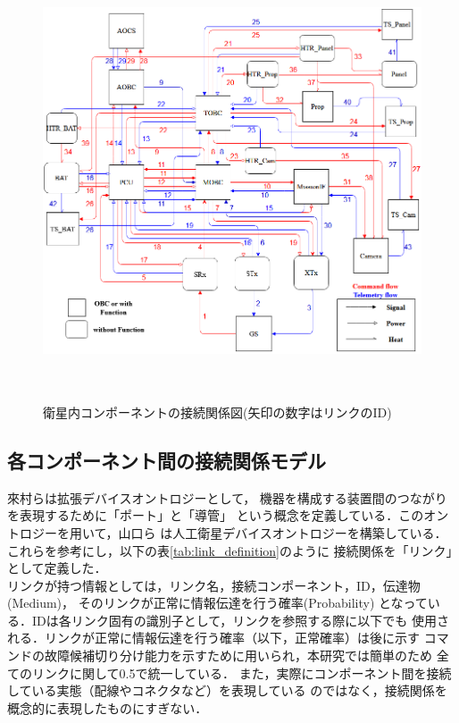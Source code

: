 \documentclass[11pt]{jsreport}
\begin{document}
\begin{figure}[H]
   \centering
      \includegraphics[height=13.0cm]{figure/satellite_diagram.png}
      \caption{衛星内コンポーネントの接続関係図(矢印の数字はリンクのID)}
      \label{fig:simple_sat}
\end{figure}

\newpage
\subsection{各コンポーネント間の接続関係モデル}
來村ら\cite{Kitamura01}は拡張デバイスオントロジーとして，
機器を構成する装置間のつながりを表現するために「ポート」と「導管」%
という概念を定義している．このオントロジーを用いて，山口ら\cite{Yamaguchi2014}
は人工衛星デバイスオントロジーを構築している．
これらを参考にし，以下の表\ref{tab:link_definition}のように
接続関係を「リンク」として定義した．\\%
リンクが持つ情報としては，リンク名，接続コンポーネント，ID，伝達物(Medium)，
そのリンクが正常に情報伝達を行う確率(Probability)%
となっている．IDは各リンク固有の識別子として，リンクを参照する際に以下でも
使用される．リンクが正常に情報伝達を行う確率（以下，正常確率）は後に示す
コマンドの故障候補切り分け能力を示すために用いられ，本研究では簡単のため
全てのリンクに関して0.5で統一している．
また，実際にコンポーネント間を接続している実態（配線やコネクタなど）を表現している
のではなく，接続関係を概念的に表現したものにすぎない．
\end{document}
